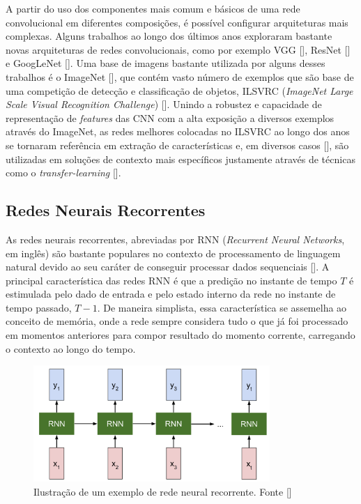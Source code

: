 A partir do uso dos componentes mais comum e básicos de uma rede convolucional em diferentes composições, é possível configurar arquiteturas mais complexas. Alguns trabalhos ao longo dos últimos anos exploraram bastante novas arquiteturas de redes convolucionais, como por exemplo VGG [], ResNet [] e GoogLeNet []. Uma base de imagens bastante utilizada por alguns desses trabalhos é o ImageNet [], que contém vasto número de exemplos que são base de uma competição de detecção e classificação de objetos, ILSVRC (\textit{ImageNet Large Scale Visual Recognition Challenge}) []. Unindo a robustez e capacidade de representação de \textit{features} das CNN com a alta exposição a diversos exemplos através do ImageNet, as redes melhores colocadas no ILSVRC ao longo dos anos se tornaram referência em extração de características e, em diversos casos [], são utilizadas em soluções de contexto mais específicos justamente através de técnicas como o \textit{transfer-learning} [].


\subsection{Redes Neurais Recorrentes}
As redes neurais recorrentes, abreviadas por RNN (\textit{Recurrent Neural Networks}, em inglês) são bastante populares no contexto de processamento de linguagem natural devido ao seu caráter de conseguir processar dados sequenciais []. A principal característica das redes RNN é que a predição no instante de tempo $T$ é estimulada pelo dado de entrada e pelo estado interno da rede no instante de tempo passado, $T - 1$. De maneira simplista, essa característica se assemelha ao conceito de memória, onde a rede sempre considera tudo o que já foi processado em momentos anteriores para compor resultado do momento corrente, carregando o contexto ao longo do tempo.

\begin{figure}
    \centering
    \includegraphics[width=0.8\textwidth]{figs/theory-example-rnn.png}
    \caption{Ilustração de um exemplo de rede neural recorrente. Fonte []}
    \label{fig:theory-rnn-example}
\end{figure}

